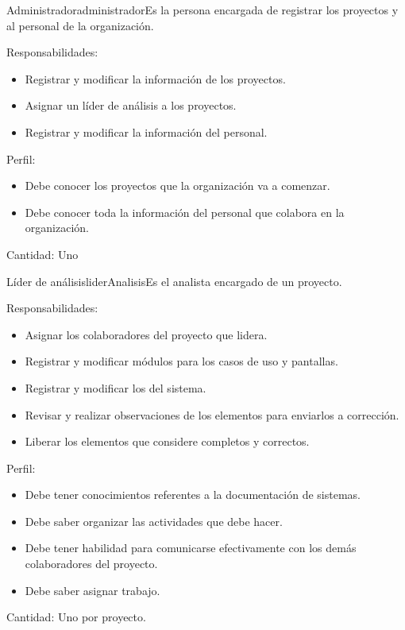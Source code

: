 \begin{actor}{Administrador}{administrador}{Es la persona encargada de registrar los proyectos y al personal de la organización.}
    \item[Responsabilidades:] \hspace{1pt}
    \begin{itemize}
	\item Registrar y modificar la información de los proyectos.
	\item Asignar un líder de análisis a los proyectos.
	\item Registrar y modificar la información del personal.
    \end{itemize}
    \item[Perfil:] \hspace{1pt}
    \begin{itemize}
	\item Debe conocer los proyectos que la organización va a  comenzar.
	\item Debe conocer toda la información del personal que colabora en la organización.
    \end{itemize}
    \item[Cantidad:] Uno
\end{actor}

\begin{actor}{Líder de análisis}{liderAnalisis}{Es el analista encargado de un proyecto.}
    \item[Responsabilidades:] \hspace{1pt}
    \begin{itemize}
	\item Asignar los colaboradores del proyecto que lidera.
	\item Registrar y modificar módulos para los casos de uso y pantallas.
	\item Registrar y modificar los  del sistema.
	\item Revisar y realizar observaciones de los elementos para enviarlos a corrección.
	\item Liberar los elementos que considere completos y correctos.
    \end{itemize}
    \item[Perfil:] \hspace{1pt}
    \begin{itemize}
	\item Debe tener conocimientos referentes a la documentación de sistemas.
	\item Debe saber organizar las actividades que debe hacer.
	\item Debe tener habilidad para comunicarse efectivamente con los demás colaboradores del proyecto.
	\item Debe saber asignar trabajo.
    \end{itemize}
    \item[Cantidad:] Uno por proyecto.
\end{actor}

